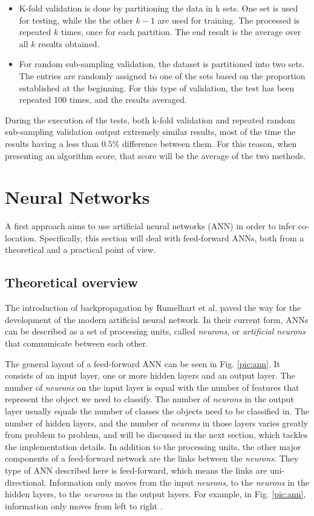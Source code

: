 \begin{itemize}
  \item K-fold validation is done by partitioning the data in k sets. One set is used for testing, while the the other $k-1$ are used for training. The processed is repeated $k$ times, once for each partition. The end result is the average over all $k$ results obtained. 
  \item For random sub-sampling validation, the dataset is partitioned into two sets. The entries are randomly assigned to one of the sets based on the proportion established at the beginning. For this type of validation, the test has been repeated 100 times, and the results averaged.   
\end{itemize}

During the execution of the tests, both k-fold validation and repeated random sub-sampling validation output extremely similar results, most of the time the results having a less than $0.5\%$ difference between them. For this reason, when presenting an algorithm score, that score will be the average of the two methods. 


\section{Neural Networks}

A first approach aims to use artificial neural networks (ANN) in order to infer co-location. Specifically, this section will deal with feed-forward ANNs, both from a theoretical and a practical point of view. 

\subsection{Theoretical overview}

The introduction of backpropagation by Rumelhart et al. \cite{rumelhart} paved the way for the development of the modern artificial neural network. In their current form, ANNs can be described as a set of processing units, called \textit{neurons}, or \textit{artificial neurons} that communicate between each other. 

The general layout of a feed-forward ANN can be seen in Fig. \ref{pic:ann}. It consists of an input layer, one or more hidden layers and an output layer. The number of \textit{neurons} on the input layer is equal with the number of features that represent the object we need to classify. The number of \textit{neurons} in the output layer usually equals the number of classes the objects need to be classified in. The number of hidden layers, and the number of \textit{neurons} in those layers varies greatly from problem to problem, and will be discussed in the next section, which tackles the implementation details.
In addition to the processing units, the other major components of a feed-forward network are the links between the \textit{neurons}. They type of ANN described here is feed-forward, which means the links are uni-directional. Information only moves from the input \textit{neurons}, to the \textit{neurons} in the hidden layers, to the \textit{neurons} in the output layers. For example, in Fig. \ref{pic:ann}, information only moves from left to right \cite{annintroduction2}.  

